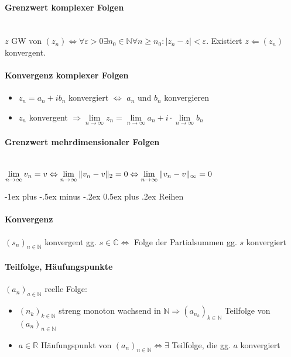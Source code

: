 \documentclass[paper=a3,paper=landscape, fontsize=9pt,DIV=25]{scrartcl}
\makeatletter
\newcommand{\real}{{\mathbb{R}}}
\newcommand{\compl}{\mathbb{C}}
\newcommand{\nat}{\mathbb{N}}
\newcommand{\aseq}{(a_n)_{n \in \nat}}
\newcommand{\srow}{(s_n)_{n \in \nat}}
\renewcommand{\section}{\@startsection{section}{1}{0mm}%
  {-1ex plus -.5ex minus -.2ex}%
  {0.5ex plus .2ex}%
  {\color{blue}\normalfont\large\bfseries}}
\makeatother
\begin{document}
\begin{multicols*}{4}
\paragraph{Grenzwert komplexer Folgen}\hspace{0pt} \\
$z$ GW von $(z_n) \Leftrightarrow \forall \varepsilon > 0 \exists n_0 \in \nat \forall n \geq n_0: |z_n - z| < \varepsilon$. Existiert $z \Leftarrow (z_n)$ konvergent.


\paragraph{Konvergenz komplexer Folgen}
\begin{itemize}
	\item $z_n = a_n + ib_n$ konvergiert $\Leftrightarrow$ $a_n$ und $b_n$ konvergieren
	\item $z_n$ konvergent $\Rightarrow \lim\limits_{n \rightarrow \infty} z_n = \lim\limits_{n \rightarrow \infty} a_n + i \cdot \lim\limits_{n \rightarrow \infty} b_n$
\end{itemize}


\paragraph{Grenzwert mehrdimensionaler Folgen}\hspace{0pt} \\
$\lim\limits_{n \rightarrow \infty} v_n = v \Leftrightarrow \lim\limits_{n \rightarrow \infty} \Arrowvert v_n - v\Arrowvert_2 = 0 \Leftrightarrow \lim\limits_{n \rightarrow \infty} \Arrowvert v_n - v\Arrowvert_\infty = 0 $

  \section{Reihen}

  \paragraph{Konvergenz}
  $\srow$ konvergent gg. $s \in \compl \Leftrightarrow$ Folge der Partialsummen gg. $s$ konvergiert

  \paragraph{Teilfolge, Häufungspunkte}
  $(a_n)_{a \in \nat}$ reelle Folge:
  \begin{itemize}
  	\item $(n_k)_{k \in \nat}$ streng monoton wachsend in $\nat \Rightarrow (a_{n_k})_{k \in \nat}$ Teilfolge von $\aseq$
  	\item $a \in \real$ Häufungspunkt von $\aseq \Leftrightarrow \exists$ Teilfolge, die gg. $a$ konvergiert
  \end{itemize}


\end{multicols*}
\end{document}
